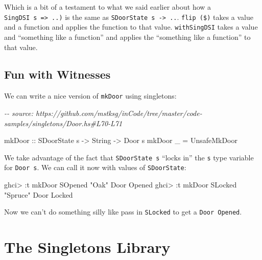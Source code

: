 \documentclass[]{article}
\newenvironment{Shaded}{}{}
\newcommand{\CommentTok}[1]{\textcolor[rgb]{0.38,0.63,0.69}{\textit{#1}}}
\newcommand{\DataTypeTok}[1]{\textcolor[rgb]{0.56,0.13,0.00}{#1}}
\newcommand{\NormalTok}[1]{#1}
\newcommand{\OperatorTok}[1]{\textcolor[rgb]{0.40,0.40,0.40}{#1}}
\newcommand{\OtherTok}[1]{\textcolor[rgb]{0.00,0.44,0.13}{#1}}
\newcommand{\StringTok}[1]{\textcolor[rgb]{0.25,0.44,0.63}{#1}}
\begin{document}
Which is a bit of a testament to what we said earlier about how a
\texttt{SingDSI\ s\ =\textgreater{}\ ..)} is the same as
\texttt{SDoorState\ s\ -\textgreater{}\ ..}. \texttt{flip\ (\$)} takes a value
and a function and applies the function to that value. \texttt{withSingDSI}
takes a value and ``something like a function'' and applies the ``something like
a function'' to that value.

\hypertarget{fun-with-witnesses}{%
\subsection{Fun with Witnesses}\label{fun-with-witnesses}}

We can write a nice version of \texttt{mkDoor} using singletons:

\begin{Shaded}
\begin{Highlighting}[]
\CommentTok{{-}{-} source: https://github.com/mstksg/inCode/tree/master/code{-}samples/singletons/Door.hs\#L70{-}L71}

\OtherTok{mkDoor ::} \DataTypeTok{SDoorState}\NormalTok{ s }\OtherTok{{-}>} \DataTypeTok{String} \OtherTok{{-}>} \DataTypeTok{Door}\NormalTok{ s}
\NormalTok{mkDoor \_ }\OtherTok{=} \DataTypeTok{UnsafeMkDoor}
\end{Highlighting}
\end{Shaded}

We take advantage of the fact that \texttt{SDoorState\ s} ``locks in'' the
\texttt{s} type variable for \texttt{Door\ s}. We can call it now with values of
\texttt{SDoorState}:

\begin{Shaded}
\begin{Highlighting}[]
\NormalTok{ghci}\OperatorTok{>} \OperatorTok{:}\NormalTok{t mkDoor }\DataTypeTok{SOpened} \StringTok{"Oak"}
\DataTypeTok{Door} \DataTypeTok{\textquotesingle{}Opened}
\NormalTok{ghci}\OperatorTok{>} \OperatorTok{:}\NormalTok{t mkDoor }\DataTypeTok{SLocked} \StringTok{"Spruce"}
\DataTypeTok{Door} \DataTypeTok{\textquotesingle{}Locked}
\end{Highlighting}
\end{Shaded}

Now we can't do something silly like pass in \texttt{SLocked} to get a
\texttt{Door\ \textquotesingle{}Opened}.

\hypertarget{the-singletons-library}{%
\section{The Singletons Library}\label{the-singletons-library}}
\end{document}
